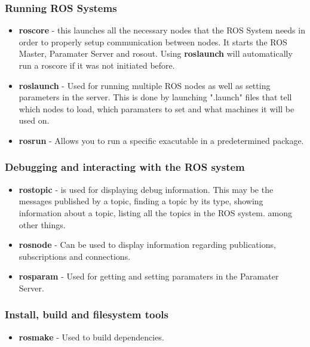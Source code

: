 \subsubsection*{Running ROS Systems}
\begin{itemize}
    \item \textbf{roscore} - this launches all the necessary nodes that the ROS System needs in order to properly setup communication between nodes. It starts the \ac{ROS} Master, Paramater Server and rosout. Using \textbf{roslaunch} will automatically run a roscore if it was not initiated before. 
    \item \textbf{roslaunch} - Used for running multiple ROS nodes as well as setting parameters in the server. This is done by launching ".launch" files that tell which nodes to load, which paramaters to set and what machines it will be used on.
    \item \textbf{rosrun} - Allows you to run a specific exacutable in a predetermined package.
\end{itemize}
\subsubsection*{Debugging and interacting with the \ac{ROS} system}
\begin{itemize}
    \item \textbf{rostopic} - is used for displaying debug information. This may be the messages published by a topic, finding a topic by its type, showing information about a topic, listing all the topics in the \ac{ROS} system. among other things.
    \item \textbf{rosnode} - Can be used to display information regarding publications, subscriptions and connections.
    \item \textbf{rosparam} - Used for getting and setting paramaters in the Paramater Server.

\end{itemize}
\subsubsection*{Install, build and filesystem tools}
\begin{itemize}
    \item \textbf{rosmake} - Used to build dependencies.
\end{itemize}




